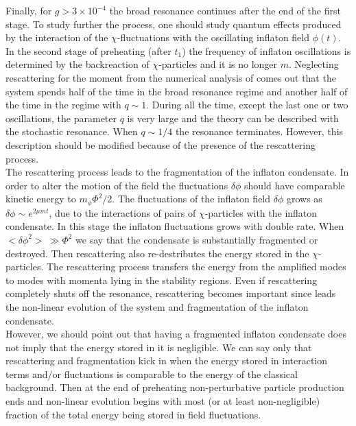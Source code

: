 \documentclass[11pt,a4paper,twoside]{book}
\begin{document}
 Finally, for $ g > 3 \times 10^{-4} $ the broad resonance continues after  the end of the first stage.  To study further the process, one should study quantum effects produced by the interaction of the $ \chi $-fluctuations with the oscillating inflaton field $\phi(t)$.\\
 In the second stage of preheating (after $ t_{1} $) the frequency  of inflaton oscillations is determined by the backreaction of $ \chi $-particles and it is no longer $ m $.
 Neglecting rescattering for the moment from the numerical analysis of \cite{Chap4:LindePreheatingModel} comes out that the system  spends half of the time in the broad resonance regime and another half of the time in the regime with $ q \sim 1 $. During all the time, except the last one or two oscillations, the parameter $ q $ is very large and the theory can be described with the stochastic resonance. When $ q\sim 1/4 $ the resonance terminates. However, this description should be modified because of the presence of the rescattering process. \\
 The rescattering process leads to the fragmentation of the inflaton condensate. In  order to alter the motion of the field the fluctuations $ \delta \phi $ should have comparable kinetic energy to $ m_{\phi}\Phi^{2}/2 $. The fluctuations of the inflaton field $\delta \phi $ grows as $\delta \phi \sim e^{2\mu m t}$, due to the interactions of pairs of $\chi$-particles with the inflaton condensate. In this stage the inflaton fluctuations grows with double rate. When $ <\delta \phi^{2}>\ \gg \Phi^{2}  $ we say that the condensate is substantially fragmented or destroyed. Then rescattering also re-destributes the energy stored in the $\chi$-particles. The rescattering process transfers the energy from the amplified  modes to modes with momenta lying in the stability regions. Even if rescattering completely shuts off the resonance, rescattering becomes important since leads the non-linear evolution of the system and fragmentation of the inflaton condensate.\\
 However, we should point out that having a fragmented inflaton condensate does not imply that the energy stored in it is negligible. We can say only that rescattering and fragmentation kick in when the energy stored in interaction terms and/or fluctuations is comparable to the energy of the classical background. Then at the end of preheating non-perturbative particle production ends and non-linear evolution begins with most (or at least non-negligible) fraction of the total energy being stored in field fluctuations.\\
\end{document}
